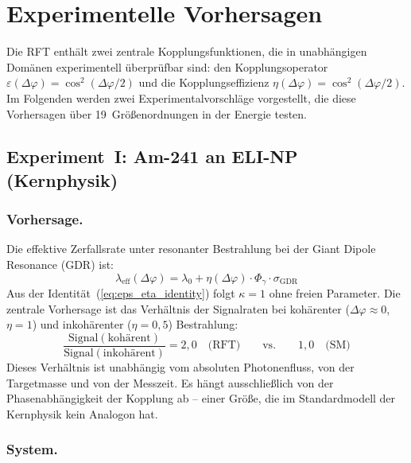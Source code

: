 \documentclass[12pt]{iopart}
\begin{document}
	
	\section{Experimentelle Vorhersagen}
	\label{sec:experimente}
	
	Die RFT enth\"alt zwei zentrale Kopplungsfunktionen, die in
	unabh\"angigen Dom\"anen experimentell \"uberpr\"ufbar sind:
	den Kopplungsoperator
	$\varepsilon(\Delta\varphi) = \cos^2(\Delta\varphi/2)$ und
	die Kopplungseffizienz
	$\eta(\Delta\varphi) = \cos^2(\Delta\varphi/2)$. Im Folgenden
	werden zwei Experimentalvorschl\"age vorgestellt, die diese
	Vorhersagen \"uber 19~Gr\"o\ss{}enordnungen in der Energie
	testen.
	
	\subsection{Experiment~I: Am-241 an ELI-NP (Kernphysik)}
	\label{sec:exp_am241}
	
	\subsubsection{Vorhersage.}
	
	Die effektive Zerfallsrate unter resonanter Bestrahlung bei der
	Giant Dipole Resonance (GDR) ist:
	\begin{equation}
		\lambda_{\mathrm{eff}}(\Delta\varphi)
		= \lambda_0
		+ \eta(\Delta\varphi) \cdot \Phi_\gamma
		\cdot \sigma_{\mathrm{GDR}}
		\label{eq:lambda_eff_exp}
	\end{equation}
	Aus der Identit\"at~(\ref{eq:eps_eta_identity}) folgt
	$\kappa = 1$ ohne freien Parameter. Die zentrale Vorhersage ist
	das Verh\"altnis der Signalraten bei koh\"arenter
	($\Delta\varphi \approx 0$, $\eta = 1$) und inkoh\"arenter
	($\eta = 0{,}5$) Bestrahlung:
	\[
		\frac{\mathrm{Signal}(\text{koh\"arent})}%
		{\mathrm{Signal}(\text{inkoh\"arent})} = 2{,}0
		\quad\text{(RFT)} \qquad\text{vs.}\qquad 1{,}0
		\quad\text{(SM)}
	\]
	Dieses Verh\"altnis ist unabh\"angig vom absoluten Photonenfluss,
	von der Targetmasse und von der Messzeit. Es h\"angt
	ausschlie\ss{}lich von der Phasenabh\"angigkeit der Kopplung
	ab -- einer Gr\"o\ss{}e, die im Standardmodell der Kernphysik
	kein Analogon hat.
	
	\subsubsection{System.}
	
\end{document}
